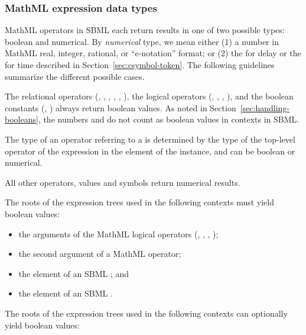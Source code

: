 \subsubsection{MathML expression data types}
\label{sec:mathmltype}

MathML operators in SBML each return results in one of two
possible types: boolean and numerical.  By
\emph{numerical} type, we mean either (1) a number in
  MathML real, integer, rational, or ``e-notation'' format;
or (2) the  for delay or the
   for time described in
  Section~\ref{sec:csymbol-token}.  The following guidelines
summarize the different possible cases.

The relational operators (, , ,
, , ), the logical operators
(, , , ), and the
boolean constants (, ) always return
boolean values.  As noted in
  Section~\ref{sec:handling-booleans}, the numbers  and
   do not count as boolean values in \mathml
  contexts in SBML.

The type of an operator referring to a \FunctionDefinition is
determined by the type of the top-level operator of the expression
in the  element of the \FunctionDefinition
instance, and can be boolean or numerical.

All other operators, values and symbols return numerical
results.

The roots of the expression trees used in the following contexts
must yield boolean values:

\begin{itemize}\setlength{\parskip}{-0.2ex}

\item the arguments of the MathML logical operators (,
, , );

\item the second argument of a MathML  operator;

\item the  element of an SBML \Event; and

\item the  element of an SBML \Constraint.

\end{itemize}

The roots of the expression trees used in the following contexts can
optionally yield boolean values:

